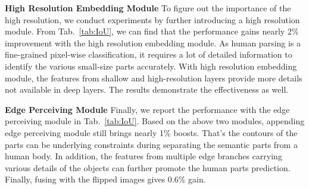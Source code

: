 \documentclass[letterpaper]{article} \usepackage{formatting-instructions-latex-2019}  \usepackage{times}  \usepackage{helvet}  \usepackage{courier}  \usepackage{url}  \usepackage{graphicx}  \frenchspacing  \setlength{\pdfpagewidth}{8.5in}  \setlength{\pdfpageheight}{11in}
\begin{document}
\noindent\textbf{High Resolution Embedding Module} To figure out the importance of the high resolution, we conduct experiments by further introducing a high resolution module. From Tab.~\ref{tab:IoU}, we can find that the performance gains nearly 2\% improvement with the high resolution embedding module. As human parsing is a fine-grained pixel-wise classification, it requires a lot of detailed information to identify the various small-size parts accurately. With high resolution embedding module, the features from shallow and high-resolution layers provide more details not available in deep layers. The results demonstrate the effectiveness as well.    

\noindent\textbf{Edge Perceiving Module} Finally, we report the performance with the edge perceiving module in Tab.~\ref{tab:IoU}. Based on the above two modules, appending edge perceiving module still brings nearly 1\% boosts. That's the contours of the parts can be underlying constraints during separating the semantic parts from a human body. In addition, the features from multiple edge branches carrying various details of the objects can further promote the human parts prediction. Finally, fusing with the flipped images gives 0.6\% gain. 
\end{document}
